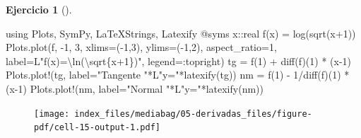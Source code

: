 \documentclass[
  a4paper,
]{scrreport}
\newenvironment{Shaded}{\begin{snugshade}}{\end{snugshade}}
\newcommand{\BuiltInTok}[1]{\textcolor[rgb]{0.00,0.23,0.31}{#1}}
\newcommand{\DataTypeTok}[1]{\textcolor[rgb]{0.68,0.00,0.00}{#1}}
\newcommand{\FloatTok}[1]{\textcolor[rgb]{0.68,0.00,0.00}{#1}}
\newcommand{\FunctionTok}[1]{\textcolor[rgb]{0.28,0.35,0.67}{#1}}
\newcommand{\ImportTok}[1]{\textcolor[rgb]{0.00,0.46,0.62}{#1}}
\newcommand{\NormalTok}[1]{\textcolor[rgb]{0.00,0.23,0.31}{#1}}
\newcommand{\OperatorTok}[1]{\textcolor[rgb]{0.37,0.37,0.37}{#1}}
\newcommand{\PreprocessorTok}[1]{\textcolor[rgb]{0.68,0.00,0.00}{#1}}
\newcommand{\StringTok}[1]{\textcolor[rgb]{0.13,0.47,0.30}{#1}}
\theoremstyle{definition}
\newtheorem{exercise}{Ejercicio}[chapter]
\theoremstyle{remark}
\begin{document}
\begin{exercise}[]
\begin{tcolorbox}
\begin{Shaded}
\begin{Highlighting}[]
\ImportTok{using} \BuiltInTok{Plots}\NormalTok{, }\BuiltInTok{SymPy}\NormalTok{, }\BuiltInTok{LaTeXStrings}\NormalTok{, }\BuiltInTok{Latexify}
\PreprocessorTok{@syms}\NormalTok{ x}\OperatorTok{::}\DataTypeTok{real}
\FunctionTok{f}\NormalTok{(x) }\OperatorTok{=} \FunctionTok{log}\NormalTok{(}\FunctionTok{sqrt}\NormalTok{(x}\OperatorTok{+}\FloatTok{1}\NormalTok{))}
\NormalTok{Plots.}\FunctionTok{plot}\NormalTok{(f, }\OperatorTok{{-}}\FloatTok{1}\NormalTok{, }\FloatTok{3}\NormalTok{, xlims}\OperatorTok{=}\NormalTok{(}\OperatorTok{{-}}\FloatTok{1}\NormalTok{,}\FloatTok{3}\NormalTok{), ylims}\OperatorTok{=}\NormalTok{(}\OperatorTok{{-}}\FloatTok{1}\NormalTok{,}\FloatTok{2}\NormalTok{), aspect\_ratio}\OperatorTok{=}\FloatTok{1}\NormalTok{, label}\OperatorTok{=}\NormalTok{L}\StringTok{"f(x)=\textbackslash{}ln(\textbackslash{}sqrt\{x+1\})"}\NormalTok{, legend}\OperatorTok{=:}\NormalTok{topright)}
\NormalTok{tg }\OperatorTok{=} \FunctionTok{f}\NormalTok{(}\FloatTok{1}\NormalTok{) }\OperatorTok{+} \FunctionTok{diff}\NormalTok{(f)(}\FloatTok{1}\NormalTok{) }\OperatorTok{*}\NormalTok{ (x}\OperatorTok{{-}}\FloatTok{1}\NormalTok{)}
\NormalTok{Plots.}\FunctionTok{plot!}\NormalTok{(tg, label}\OperatorTok{=}\StringTok{"Tangente "}\OperatorTok{*}\NormalTok{L}\StringTok{"y="}\FunctionTok{*latexify}\NormalTok{(tg))}
\NormalTok{nm }\OperatorTok{=} \FunctionTok{f}\NormalTok{(}\FloatTok{1}\NormalTok{) }\OperatorTok{{-}} \FloatTok{1}\OperatorTok{/}\FunctionTok{diff}\NormalTok{(f)(}\FloatTok{1}\NormalTok{) }\OperatorTok{*}\NormalTok{ (x}\OperatorTok{{-}}\FloatTok{1}\NormalTok{)}
\NormalTok{Plots.}\FunctionTok{plot!}\NormalTok{(nm, label}\OperatorTok{=}\StringTok{"Normal "}\OperatorTok{*}\NormalTok{L}\StringTok{"y="}\FunctionTok{*latexify}\NormalTok{(nm))}
\end{Highlighting}
\end{Shaded}

\begin{figure}[H]

{\centering \texttt{[image: index\_files/mediabag/05-derivadas\_files/figure-pdf/cell-15-output-1.pdf]}

}

\end{figure}

\end{tcolorbox}

\end{exercise}
\end{document}
